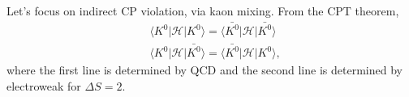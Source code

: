 Let's focus on indirect CP violation, via kaon mixing. From the CPT theorem,
\begin{equation}
\begin{split}
&\langle K^0 | \mathcal{H} | K^0 \rangle = \langle \bar{K^0} | \mathcal{H} | \bar{K^0} \rangle \\
&\langle K^0 | \mathcal{H} | \bar{K^0} \rangle = \langle \bar{K^0} | \mathcal{H} | K^0 \rangle,
\end{split}
\end{equation}
where the first line is determined by QCD and the second line is determined by electroweak for $\Delta S = 2$.